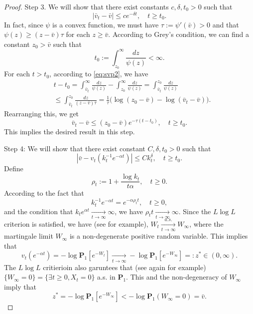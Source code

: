 \documentclass[12pt,a4paper]{amsart}
\theoremstyle{plain}
\theoremstyle{definition}
\numberwithin{equation}{section}
\begin{document}
\begin{proof}
    Step 3. We will show that there exist constants $c, \delta, t_0 > 0$ such that
\[
    |\bar v_t-\bar v|
    \leq ce^{-\delta t},
    \quad t\geq t_0.
\]
    In fact, since $\psi$ is a convex function, we must have $\tau:=\psi'(\bar v)>0$ and that  $\psi(z) \geq (z-\bar v)\tau$ for each $z\geq \bar v$.
    According to Grey's condition, we can find a constant $z_0 >\bar v $ such that
\[
    t_0
    := \int^\infty_{z_0} \frac{dz}{\psi(z)} < \infty.
\]
    For each $t > t_0$, according to \eqref{eq:svp2}, we have
\begin{equation}\begin{split}
    &t-t_0 = \int^\infty_{\bar v_t} \frac{dz}{\psi(z)} - \int_{z_0}^\infty \frac{dz}{\psi(z)}
    =\int_{\bar v_t}^{z_0} \frac{dz}{\psi(z)}
    \\ &\leq \int_{\bar v_t}^{z_0} \frac{dz}{(z-\bar v)\tau}
    = \frac{1}{\tau} \big(\log (z_0-\bar v) - \log(\bar v_t-\bar v)\big).
\end{split}\end{equation}
    Rearranging this, we get
\[
    \bar v_t - \bar v \leq (z_0 - \bar v)e^{-\tau(t-t_0)},
    \quad t\geq t_0.
\]
    This implies the desired result in this step.

    Step 4: We will show that there exist constant $C, \delta,t_0>0$ such that
\[
    |\bar v - v_t(k_t^{-1} e^{-\alpha t})|\leq Ck_t^\delta, \quad t\geq t_0.
\]
    Define
\[
    \rho_t := 1+ \frac{\log k_t}{t\alpha}, \quad t\geq 0.
\]
    According to the fact that
\[
    k_t^{-1}e^{-\alpha t} = e^{-\alpha \rho_t t}, \quad t\geq 0,
\]
    and the condition that $k_t e^{\alpha t} \xrightarrow[t\to \infty]{} \infty$, we have $\rho_t t \xrightarrow[t\to \infty]{} \infty $.
    Since the $L\log L$ criterion is satisfied, we have (see \cite{LiuRenSong2009Llog} for example), $W_t \xrightarrow[t\to \infty]{a.s.} W_\infty$, where the martingale limit $W_\infty$ is a non-degenerate positive random variable. This implies that
\[
    v_t(e^{-\alpha t}) = -\log \mathbf P_1[e^{-W_t}]\xrightarrow[t\to \infty]{} - \log \mathbf P_{1}[e^{-W_\infty}] =: z^* \in (0,\infty).
\]
    The $L \log L$ critierioin also garuntees that (see again \cite{LiuRenSong2009Llog} for example) $\{W_\infty = 0\} = \{\exists t \geq 0, X_t= 0\}$  a.s. in $\mathbf P_1$. This and the non-degeneracy of $W_\infty$ imply that
\[
    z^*=-\log \mathbf P_1[e^{-W_\infty}] < -\log \mathbf P_1(W_\infty = 0) = \bar v.
\]


\end{proof}
\end{document}
